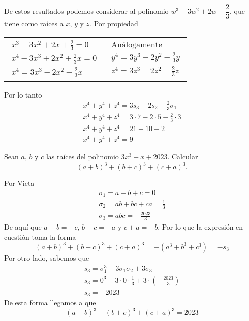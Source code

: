 \begin{solution}
    De estos resultados podemos considerar al polinomio $w^3 - 3w^2 + 2w + \dfrac{2}{3}$, que tiene como raíces a $x$, $y$ y $z$.
    Por propiedad
    \vspace{-10mm}
    \begin{table}[H]
        \centering
        \begin{tabular}{p{5cm} p{5cm}}
            \begin{gather*}
                x^3 - 3x^2 + 2x + \frac{2}{3} = 0\\
                x^4 - 3x^3 + 2x^2 + \frac{2}{3}x = 0\\
                x^4 = 3x^3 - 2x^2 - \frac{2}{3}x
            \end{gather*}
            &
            \begin{gather*}
                \mbox{Análogamente}\\
                y^4 = 3y^3 - 2y^2 - \frac{2}{3}y\\
                z^4 = 3z^3 - 2z^2 - \frac{2}{3}z
            \end{gather*}
        \end{tabular}
    \end{table}
    \vspace{-10mm}

    Por lo tanto
    \begin{gather*}
        x^4 + y^4 + z^4 = 3s_3 - 2s_2 - \frac{2}{3}\sigma_1\\
        x^4 + y^4 + z^4 = 3\cdot7 - 2\cdot5 - \frac{2}{3} \cdot 3\\
        x^4 + y^4 + z^4 = 21 - 10 - 2\\
        \boxed{x^4 + y^4 + z^4 = 9}
    \end{gather*}
\end{solution}


\begin{section-problem}
    Sean $a$, $b$ y $c$ las raíces del polinomio $3x^3 + x + 2023$.
    Calcular \[(a + b)^3 + (b + c)^3 + (c + a)^3.\]
\end{section-problem}

\begin{solution}
    Por Vieta
    \begin{gather*}
        \sigma_1 = a + b + c = 0\\
        \sigma_2 = ab + bc + ca = \frac{1}{3}\\
        \sigma_3 = abc = - \frac{2023}{3}
    \end{gather*}
    De aquí que $a + b = -c$, $b + c = -a$ y $c + a = -b$.
    Por lo que la expresión en cuestión toma la forma
    \[(a + b)^3 + (b + c)^3 + (c + a)^3 = - (a^3 + b^3 + c^3) = - s_ 3\]
    Por otro lado, sabemos que
    \begin{gather*}
        s_3 = \sigma_1^3 - 3\sigma_1 \sigma_2 + 3\sigma_3\\
        s_3 = 0^3 - 3\cdot 0 \cdot \frac{1}{3} + 3\cdot (- \frac{2023}{3})\\
        s_3 = -2023
    \end{gather*}
    De esta forma llegamos a que
    \[(a + b)^3 + (b + c)^3 + (c + a)^3 = \boxed{2023}\]
\end{solution}

